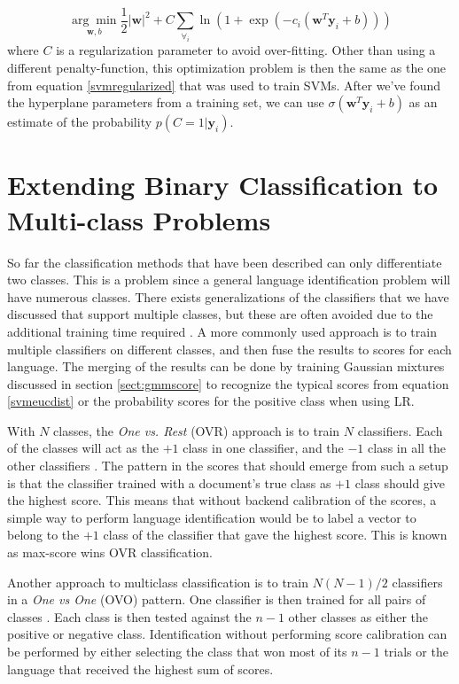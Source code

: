 \begin{equation}
\label{logisticreg}
\underset{\mathbf{w}, b}{\arg \min} \frac{1}{2}|\mathbf{w}|^2+C\sum_{\forall_i} \ln(1+\exp(-c_i(\mathbf{w}^T\mathbf{y}_i+b)))
\end{equation}
\cite{liblinear} where $C$ is a regularization parameter to avoid over-fitting. Other than using a different penalty-function, this optimization problem is then the same as the one from equation \ref{svmregularized} that was used to train SVMs. After we've found the hyperplane parameters from a training set, we can use $\sigma(\mathbf{w}^T\mathbf{y}_i+b)$ as an estimate of the probability $p(C=1|\mathbf{y}_i)$.

\section{Extending Binary Classification to Multi-class Problems}
\label{sect:multiclass}

So far the classification methods that have been described can only differentiate two classes. This is a problem since a general language identification problem will have numerous classes. There exists generalizations of the classifiers that we have discussed that support multiple classes, but these are often avoided due to the additional training time required \cite{hsu2002comparison}. A more commonly used approach is to train multiple classifiers on different classes, and then fuse the results to scores for each language. The merging of the results can be done by training Gaussian mixtures discussed in section \ref{sect:gmmscore} to recognize the typical scores from equation \ref{svmeucdist} or the probability scores for the positive class when using LR.

With $N$ classes, the \emph{One vs. Rest} (OVR) approach is to train $N$ classifiers. Each of the classes will act as the $+1$ class in one classifier, and the $-1$ class in all the other classifiers \cite{hsu2002comparison}. The pattern in the scores that should emerge from such a setup is that the classifier trained with a document's true class as $+1$ class should give the highest score. This means that without backend calibration of the scores, a simple way to perform language identification would be to label a vector to belong to the $+1$ class of the classifier that gave the highest score. This is known as max-score wins OVR classification.

Another approach to multiclass classification is to train $N(N-1)/2$ classifiers in a \emph{One vs One} (OVO) pattern. One classifier is then trained for all pairs of classes \cite{hsu2002comparison}. Each class is then tested against the $n-1$ other classes as either the positive or negative class. Identification without performing score calibration can be performed by either selecting the class that won most of its $n-1$ trials \cite{hsu2002comparison} or the language that received the highest sum of scores.

